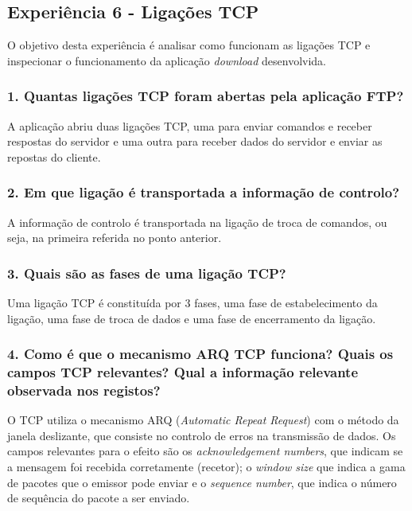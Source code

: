\subsection*{Experiência 6 - Ligações TCP}
O objetivo desta experiência é analisar como funcionam as ligações TCP e inspecionar o funcionamento da aplicação \emph{download} desenvolvida.

\subsubsection{1. Quantas ligações TCP foram abertas pela aplicação FTP?}
A aplicação abriu duas ligações TCP, uma para enviar comandos e receber respostas do servidor e 
uma outra para receber dados do servidor e enviar as repostas do cliente.

\subsubsection{2. Em que ligação é transportada a informação de controlo?}
A informação de controlo é transportada na ligação de troca de comandos, ou seja, na primeira referida no ponto anterior.

\subsubsection{3. Quais são as fases de uma ligação TCP?}
Uma ligação TCP é constituída por 3 fases, uma fase de estabelecimento da ligação, uma fase de troca de dados e uma fase de encerramento da ligação.

\subsubsection{4. Como é que o mecanismo ARQ TCP funciona? Quais os campos TCP relevantes? Qual a informação relevante observada nos registos?}
O TCP utiliza o mecanismo ARQ (\emph{Automatic Repeat Request}) com o método da janela deslizante, que consiste no controlo de erros na transmissão de dados. 
Os campos relevantes para o efeito são os \emph{acknowledgement numbers}, que indicam se a mensagem foi recebida corretamente (recetor); o \emph{window size} que indica a gama de pacotes que o emissor pode enviar e o \emph{sequence number}, que indica o número de sequência do pacote a ser enviado.

